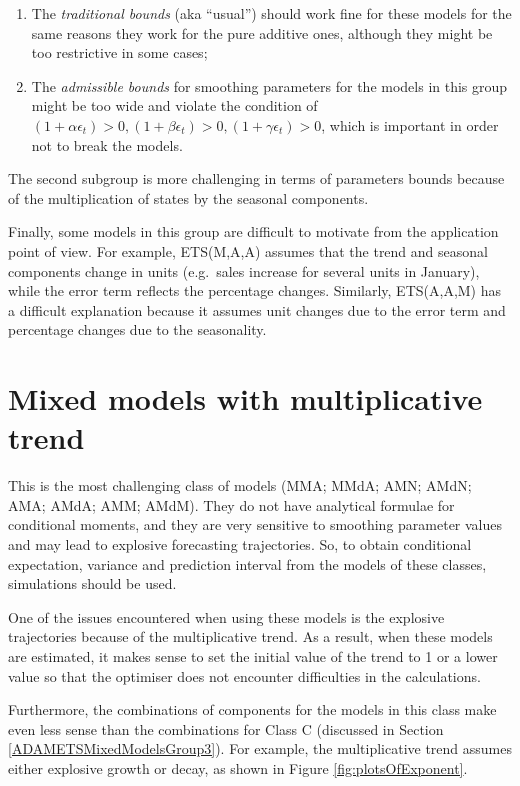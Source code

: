 \documentclass[]{book}
\providecommand{\tightlist}{%
  \setlength{\itemsep}{0pt}\setlength{\parskip}{0pt}}
\theoremstyle{definition}
\theoremstyle{definition}
\theoremstyle{definition}
\theoremstyle{definition}
\theoremstyle{remark}
\begin{document}
\begin{enumerate}
\def\labelenumi{\arabic{enumi}.}
\tightlist
\item
  The \emph{traditional bounds} (aka ``usual'') should work fine for these models for the same reasons they work for the pure additive ones, although they might be too restrictive in some cases;
\item
  The \emph{admissible bounds} for smoothing parameters for the models in this group might be too wide and violate the condition of \((1+ \alpha \epsilon_t)>0, (1+ \beta \epsilon_t)>0, (1+ \gamma \epsilon_t)>0\), which is important in order not to break the models.
\end{enumerate}

The second subgroup is more challenging in terms of parameters bounds because of the multiplication of states by the seasonal components.

Finally, some models in this group are difficult to motivate from the application point of view. For example, ETS(M,A,A) assumes that the trend and seasonal components change in units (e.g.~sales increase for several units in January), while the error term reflects the percentage changes. Similarly, ETS(A,A,M) has a difficult explanation because it assumes unit changes due to the error term and percentage changes due to the seasonality.

\hypertarget{ADAMETSMixedModelsGroup4}{%
\section{Mixed models with multiplicative trend}\label{ADAMETSMixedModelsGroup4}}

This is the most challenging class of models (MMA; MMdA; AMN; AMdN; AMA; AMdA; AMM; AMdM). They do not have analytical formulae for conditional moments, and they are very sensitive to smoothing parameter values and may lead to explosive forecasting trajectories. So, to obtain conditional expectation, variance and prediction interval from the models of these classes, simulations should be used.

One of the issues encountered when using these models is the explosive trajectories because of the multiplicative trend. As a result, when these models are estimated, it makes sense to set the initial value of the trend to 1 or a lower value so that the optimiser does not encounter difficulties in the calculations.

Furthermore, the combinations of components for the models in this class make even less sense than the combinations for Class C (discussed in Section \ref{ADAMETSMixedModelsGroup3}). For example, the multiplicative trend assumes either explosive growth or decay, as shown in Figure \ref{fig:plotsOfExponent}.
\end{document}
